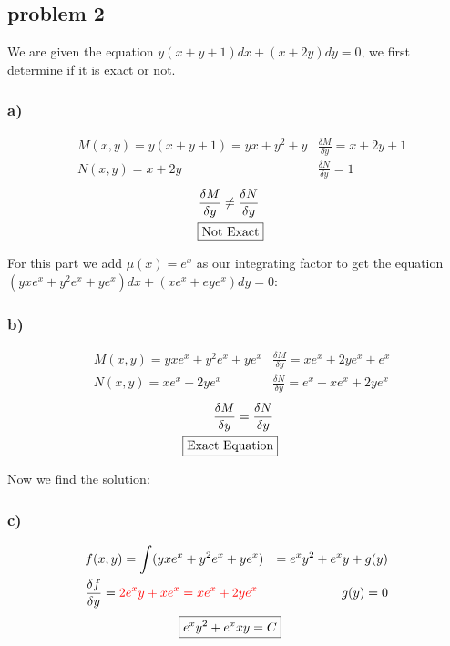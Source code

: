 \documentclass{article}
\begin{document}
\setcounter{subsection}{3}
\subsection{problem 2}
We are given the equation $y(x + y + 1)dx + (x + 2y)dy = 0$, we first determine if it is exact or not.
\setcounter{subsubsection}{1}
\subsubsection{a)}
\begin{align*}
    &M(x,y) = y(x + y + 1) = yx + y^2 + y & \frac{\delta M}{\delta y} = x + 2y + 1\\
    &N(x,y) = x + 2y & \frac{\delta N}{\delta y} = 1 
\end{align*}
\begin{align*}
    \frac{\delta M}{\delta y} \not= \frac{\delta N}{\delta y}\\ \Aboxed{\text{Not Exact}}
\end{align*}


\setcounter{subsubsection}{1}
For this part we add $\mu(x) = e^x$ as our integrating factor to get the equation 
$(yxe^x + y^2e^x + ye^x)dx + (xe^x + eye^x)dy = 0$:
\subsubsection{b)} 
\begin{align*}
    &M(x,y) =  yxe^x + y^2e^x + ye^x & \frac{\delta M}{\delta y} = xe^x + 2ye^x + e^x\\
    &N(x,y) = xe^x + 2ye^x & \frac{\delta N}{\delta y} = e^x + xe^x + 2ye^x
\end{align*}
\begin{align*}
    \frac{\delta M}{\delta y} = \frac{\delta N}{\delta y}\\ \Aboxed{\text{Exact Equation}}
\end{align*}

\setcounter{subsubsection}{1}
Now we find the solution:
\subsubsection{c)} 
\begin{align}
    & f(x,y) = \int(yxe^x + y^2e^x + ye^x) &= e^xy^2 + e^xy + g(y) \\
    & \frac{\delta f}{\delta y} = \textcolor{red}{2e^xy+xe^x = xe^x + 2ye^x} & g(y) = 0
\end{align}
\begin{align}
     \Aboxed{e^xy^2 + e^xxy = C}
\end{align}
\end{document}
